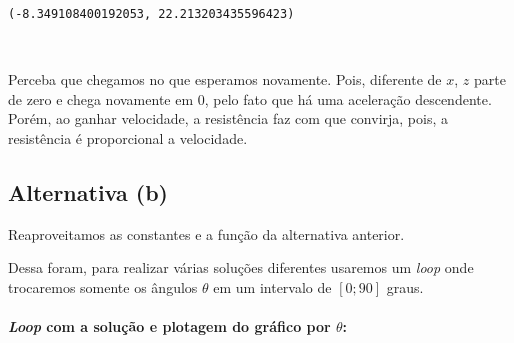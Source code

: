 \documentclass[12pt]{article}
\makeatletter
\newcommand{\boxspacing}{\kern\kvtcb@left@rule\kern\kvtcb@boxsep}
\newcommand{\prompt}[4]{
        {\ttfamily\llap{{\color{#2}[#3]:\hspace{3pt}#4}}\vspace{-\baselineskip}}
    }
\makeatother
\begin{document}
            \begin{tcolorbox}[breakable, size=fbox, boxrule=.5pt, pad at break*=1mm, opacityfill=0]
\prompt{Out}{outcolor}{7}{\boxspacing}
\begin{Verbatim}[commandchars=\\\{\}]
(-8.349108400192053, 22.213203435596423)
\end{Verbatim}
\end{tcolorbox}
        
    \begin{center}
    \end{center}
    { \hspace*{\fill} \\}
    
    Perceba que chegamos no que esperamos novamente. Pois, diferente de
\(x\), \(z\) parte de zero e chega novamente em \(0\), pelo fato que há
uma aceleração descendente. Porém, ao ganhar velocidade, a resistência
faz com que convirja, pois, a resistência é proporcional a velocidade.

\hypertarget{alternativa-b}{%
\subsection{Alternativa (b)}\label{alternativa-b}}

Reaproveitamos as constantes e a função da alternativa anterior.

Dessa foram, para realizar várias soluções diferentes usaremos um
\emph{loop} onde trocaremos somente os ângulos \(\theta\) em um
intervalo de \([0; 90]\) graus.

\hypertarget{loop-com-a-soluuxe7uxe3o-e-plotagem-do-gruxe1fico-por-theta}{%
\paragraph{\texorpdfstring{\emph{Loop} com a solução e plotagem do
gráfico por
\(\theta\):}{Loop com a solução e plotagem do gráfico por \textbackslash{}theta:}}\label{loop-com-a-soluuxe7uxe3o-e-plotagem-do-gruxe1fico-por-theta}}
\end{document}
